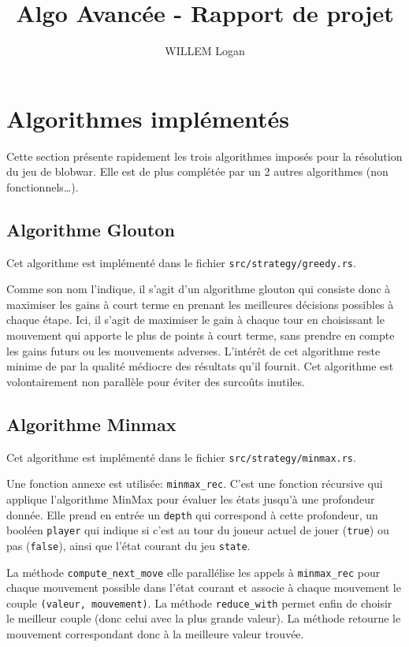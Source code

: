 \documentclass[10pt]{article}
\title{Algo Avancée - Rapport de projet}
\author{WILLEM Logan}
\date{}
\begin{document}
\maketitle
\tableofcontents

\newpage

\section{Algorithmes implémentés}

Cette section présente rapidement les trois algorithmes imposés pour la résolution du jeu de blobwar.
Elle est de plus complétée par un 2 autres algorithmes (non fonctionnels\dots).

\subsection{Algorithme Glouton}

Cet algorithme est implémenté dans le fichier \verb|src/strategy/greedy.rs|.

Comme son nom l'indique, il s'agit d'un algorithme glouton qui consiste donc à maximiser les gains à court terme en prenant les meilleures décisions possibles à chaque étape.
Ici, il s'agit de maximiser le gain à chaque tour en choisissant le mouvement qui apporte le plus de points à court terme, sans prendre en compte les gains futurs ou les mouvements adverses.
L'intérêt de cet algorithme reste minime de par la qualité médiocre des résultats qu'il fournit.
Cet algorithme est volontairement non parallèle pour éviter des surcoûts inutiles.

\subsection{Algorithme Minmax}

Cet algorithme est implémenté dans le fichier \verb|src/strategy/minmax.rs|.

Une fonction annexe est utilisée: \verb|minmax_rec|. C'est une fonction récursive qui applique l'algorithme MinMax pour évaluer les états jusqu'à une profondeur donnée.
Elle prend en entrée un \verb|depth| qui correspond à cette profondeur, un booléen \verb|player| qui indique si c'est au tour du joueur actuel de jouer (\verb|true|) ou pas (\verb|false|), ainsi que l'état courant du jeu \verb|state|.

La méthode \verb|compute_next_move| elle parallélise les appels à \verb|minmax_rec| pour chaque mouvement possible dans l'état courant et associe à chaque mouvement le couple \verb|(valeur, mouvement)|. La méthode \verb|reduce_with| permet enfin de choisir le meilleur couple (donc celui avec la plus grande valeur).
La méthode retourne le mouvement correspondant donc à la meilleure valeur trouvée.
\end{document}
